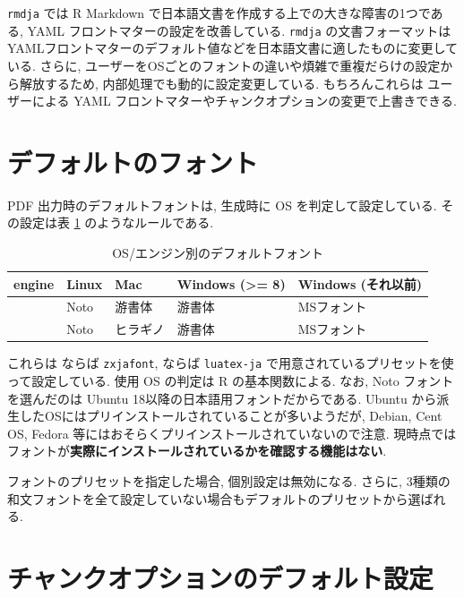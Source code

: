 \documentclass[
  xelatex,ja=standard,jafont=noto]{bxjsbook}
\theoremstyle{definition}
\theoremstyle{definition}
\theoremstyle{definition}
\theoremstyle{definition}
\theoremstyle{remark}
\begin{document}
\texttt{rmdja} では R Markdown
で日本語文書を作成する上での大きな障害の1つである, YAML
フロントマターの設定を改善している. \texttt{rmdja}
の文書フォーマットはYAMLフロントマターのデフォルト値などを日本語文書に適したものに変更している.
さらに,
ユーザーをOSごとのフォントの違いや煩雑で重複だらけの設定から解放するため,
内部処理でも動的に設定変更している. もちろんこれらは ユーザーによる YAML
フロントマターやチャンクオプションの変更で上書きできる.

\hypertarget{ux30c7ux30d5ux30a9ux30ebux30c8ux306eux30d5ux30a9ux30f3ux30c8}{%
\section{デフォルトのフォント}\label{ux30c7ux30d5ux30a9ux30ebux30c8ux306eux30d5ux30a9ux30f3ux30c8}}

PDF 出力時のデフォルトフォントは, 生成時に OS を判定して設定している.
その設定は表 \ref{tab:font-default} のようなルールである.

\begin{table}[!h]

\caption{\label{tab:font-default}OS/エンジン別のデフォルトフォント}
\centering
\begin{tabular}[t]{>{}lllll}
\toprule
engine & Linux & Mac & Windows (>= 8) & Windows (それ以前)\\
\midrule
\cellcolor{gray}{XeLaTeX} & Noto & 游書体 & 游書体 & MSフォント\\
\cellcolor{gray}{LuaLaTeX} & Noto & ヒラギノ & 游書体 & MSフォント\\
\bottomrule
\end{tabular}
\end{table}

これらは \XeLaTeX ならば \texttt{zxjafont}, \LuaLaTeX ならば
\texttt{luatex-ja} で用意されているプリセットを使って設定している. 使用
OS の判定は R の基本関数による. なお, Noto フォントを選んだのは Ubuntu
18以降の日本語用フォントだからである. Ubuntu
から派生したOSにはプリインストールされていることが多いようだが, Debian,
Cent OS, Fedora 等にはおそらくプリインストールされていないので注意.
現時点ではフォントが\textbf{実際にインストールされているかを確認する機能はない}.

フォントのプリセットを指定した場合, 個別設定は無効になる. さらに,
3種類の和文フォントを全て設定していない場合もデフォルトのプリセットから選ばれる.

\hypertarget{ux30c1ux30e3ux30f3ux30afux30aaux30d7ux30b7ux30e7ux30f3ux306eux30c7ux30d5ux30a9ux30ebux30c8ux8a2dux5b9a}{%
\section{チャンクオプションのデフォルト設定}\label{ux30c1ux30e3ux30f3ux30afux30aaux30d7ux30b7ux30e7ux30f3ux306eux30c7ux30d5ux30a9ux30ebux30c8ux8a2dux5b9a}}
\end{document}
